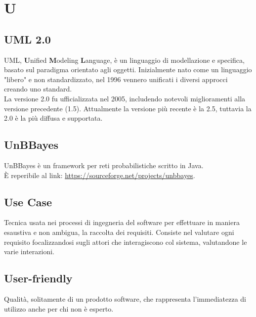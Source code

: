 \section*{U}

\subsection{UML 2.0}
UML, \textbf{U}nified \textbf{M}odeling \textbf{L}anguage, è un linguaggio di modellazione e specifica, basato sul paradigma orientato agli oggetti. Inizialmente nato come un linguaggio "libero" e non standardizzato, nel 1996 vennero unificati i diversi approcci creando uno standard. \-\\
La versione 2.0 fu ufficializzata nel 2005, includendo notevoli miglioramenti alla versione precedente (1.5). Attualmente la versione più recente è la 2.5, tuttavia la 2.0 è la più diffusa e supportata.

\subsection{UnBBayes}
UnBBayes è un framework per reti probabilistiche scritto in Java. \\
È reperibile al link: \url{https://sourceforge.net/projects/unbbayes}.

\subsection{Use Case}
Tecnica usata nei processi di ingegneria del software per effettuare in maniera esaustiva e non ambigua, la raccolta dei requisiti. Consiste nel valutare ogni requisito focalizzandosi sugli attori che interagiscono col sistema, valutandone le varie interazioni.

\subsection{User-friendly} 
Qualità, solitamente di un prodotto software, che rappresenta l'immediatezza di utilizzo anche per chi non è esperto.
